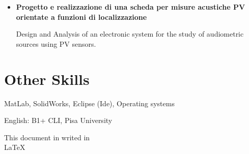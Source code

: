 \documentclass{article}
\begin{document}
\begin{itemize}
\item \textbf{Progetto e realizzazione di una scheda per misure acustiche PV orientate a funzioni di localizzazione}

Design and Analysis of an electronic system for the study of audiometric sources using PV sensors.

\end{itemize}

 \section{Other Skills}
\begin{description}[widest=Langauges]
\item[Software] MatLab, SolidWorks, Eclipse (Ide), Operating systems
\item[Languages] English: B1+ CLI, Pisa University
\item[LATEX] This document in writed in \\LaTeX
\end{description}
\end{document}
